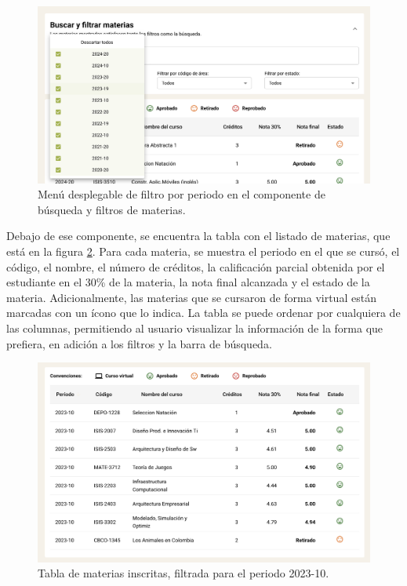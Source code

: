 \begin{figure}[H]
	\centering
	\includegraphics[width=\textwidth]{assets/nes/filtro_periodo_materias.png}
	\caption{Menú desplegable de filtro por periodo en el componente de búsqueda y filtros de materias.}
	\label{fig:filtro_periodo_materias}
\end{figure}

Debajo de ese componente, se encuentra la tabla con el listado de materias, que está en la figura \ref{fig:tabla_materias}. Para cada materia, se muestra el periodo en el que se cursó, el código, el nombre, el número de créditos, la calificación parcial obtenida por el estudiante en el 30\% de la materia, la nota final alcanzada y el estado de la materia. Adicionalmente, las materias que se cursaron de forma virtual están marcadas con un ícono que lo indica. La tabla se puede ordenar por cualquiera de las columnas, permitiendo al usuario visualizar la información de la forma que prefiera, en adición a los filtros y la barra de búsqueda.

\begin{figure}[H]
	\centering
	\includegraphics[width=\textwidth]{assets/nes/tabla_materias.png}
	\caption{Tabla de materias inscritas, filtrada para el periodo 2023-10.}
	\label{fig:tabla_materias}
\end{figure}

